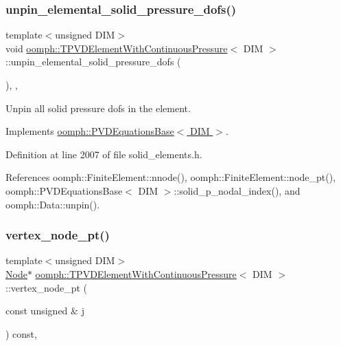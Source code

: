 \subsubsection{\texorpdfstring{unpin\+\_\+elemental\+\_\+solid\+\_\+pressure\+\_\+dofs()}{unpin\_elemental\_solid\_pressure\_dofs()}}
{\footnotesize\ttfamily template$<$unsigned D\+IM$>$ \\
void \hyperlink{classoomph_1_1TPVDElementWithContinuousPressure}{oomph\+::\+T\+P\+V\+D\+Element\+With\+Continuous\+Pressure}$<$ D\+IM $>$\+::unpin\+\_\+elemental\+\_\+solid\+\_\+pressure\+\_\+dofs (\begin{DoxyParamCaption}{ }\end{DoxyParamCaption})\hspace{0.3cm}{\ttfamily [inline]}, {\ttfamily [private]}, {\ttfamily [virtual]}}



Unpin all solid pressure dofs in the element. 



Implements \hyperlink{classoomph_1_1PVDEquationsBase_abd9064a8651728806dda27636b1e5b50}{oomph\+::\+P\+V\+D\+Equations\+Base$<$ D\+I\+M $>$}.



Definition at line 2007 of file solid\+\_\+elements.\+h.



References oomph\+::\+Finite\+Element\+::nnode(), oomph\+::\+Finite\+Element\+::node\+\_\+pt(), oomph\+::\+P\+V\+D\+Equations\+Base$<$ D\+I\+M $>$\+::solid\+\_\+p\+\_\+nodal\+\_\+index(), and oomph\+::\+Data\+::unpin().

\mbox{\label{classoomph_1_1TPVDElementWithContinuousPressure_a24200726cc04eec0150070d8a223ae8f}} 
\subsubsection{\texorpdfstring{vertex\+\_\+node\+\_\+pt()}{vertex\_node\_pt()}}
{\footnotesize\ttfamily template$<$unsigned D\+IM$>$ \\
\hyperlink{classoomph_1_1Node}{Node}$\ast$ \hyperlink{classoomph_1_1TPVDElementWithContinuousPressure}{oomph\+::\+T\+P\+V\+D\+Element\+With\+Continuous\+Pressure}$<$ D\+IM $>$\+::vertex\+\_\+node\+\_\+pt (\begin{DoxyParamCaption}\item[{const unsigned \&}]{j }\end{DoxyParamCaption}) const\hspace{0.3cm}{\ttfamily [inline]}, {\ttfamily [virtual]}}



